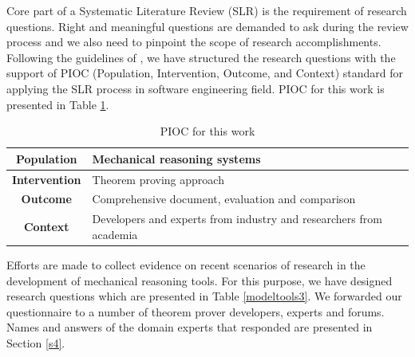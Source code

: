 \label{s3}
Core part of a Systematic Literature Review (SLR) is the requirement of research questions. Right and meaningful questions are demanded 
to ask during the review process and we also need to pinpoint the scope of research accomplishments. Following the guidelines of 
, we have structured the research questions with the support of PIOC (Population, Intervention, Outcome, and Context) 
standard for applying the SLR process in software engineering field. PIOC for this work is presented in Table  \ref{modeltools}.
\vspace{-2mm}
\begin{table}[!htb]
 \caption{PIOC for this work}\vspace{-2mm} 
 \centering 
\begin{tabular}{|c|p{6.3cm}|}
  \hline
  \textbf{Population} & Mechanical reasoning systems\\  \hline
  \textbf{Intervention} & Theorem proving approach \\    \hline
   \textbf{Outcome} & Comprehensive document, evaluation and comparison \\       \hline
  \textbf{Context} & Developers and experts from industry and researchers from academia \\
  \hline
\end{tabular}
\label{modeltools}
\end{table}\vspace{-.2cm}
Efforts are made to collect evidence on recent scenarios of research in the development
of mechanical reasoning tools. For this purpose, we have designed research questions which are presented in Table
\ref{modeltools3}. 
We forwarded our questionnaire to a number of theorem prover developers, experts and forums.
Names and answers of the domain experts that responded are presented in Section \ref{s4}. \vspace{5mm}
